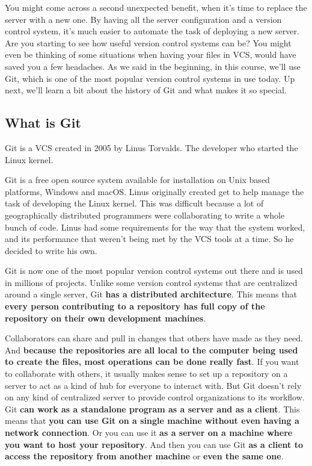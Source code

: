 	You might come across a second unexpected benefit, when it's time to replace the server with a new one. By having all the server configuration and a version control system, it's much easier to automate the task of deploying a new server. Are you starting to see how useful version control systems can be? You might even be thinking of some situations when having your files in VCS, would have saved you a few headaches. As we said in the beginning, in this course, we'll use Git, which is one of the most popular version control systems in use today. Up next, we'll learn a bit about the history of Git and what makes it so special.
	
	\subsection{What is Git}
		
	Git is a VCS created in 2005 by Linus Torvalds. The developer who started the Linux kernel.
	
	Git is a free open source system available for installation on Unix based platforms, Windows and macOS. Linus originally created get to help manage the task of developing the Linux kernel. This was difficult because a lot of geographically distributed programmers were collaborating to write a whole bunch of code. Linus had some requirements for the way that the system worked, and its performance that weren't being met by the VCS tools at a time. So he decided to write his own. 
	
	Git is now one of the most popular version control systems out there and is used in millions of projects. Unlike some version control systems that are centralized around a single server, Git \textbf{has a distributed architecture}. This means that \textbf{every person contributing to a repository has full copy of the repository on their own development machines}.
	
	Collaborators can share and pull in changes that others have made as they need. And \textbf{because the repositories are all local to the computer being used to create the files, most operations can be done really fast}. 
	If you want to collaborate with others, it usually makes sense to set up a repository on a server to act as a kind of hub for everyone to interact with. But Git doesn't rely on any kind of centralized server to provide control organizations to its workflow. Git \textbf{can work as a standalone program as a server and as a client}. This means that \textbf{you can use Git on a single machine without even having a network connection}. Or you can use it \textbf{as a server on a machine where you want to host your repository}. And then you can use Git \textbf{as a client to access the repository from another machine} or \textbf{even the same one}.
	

